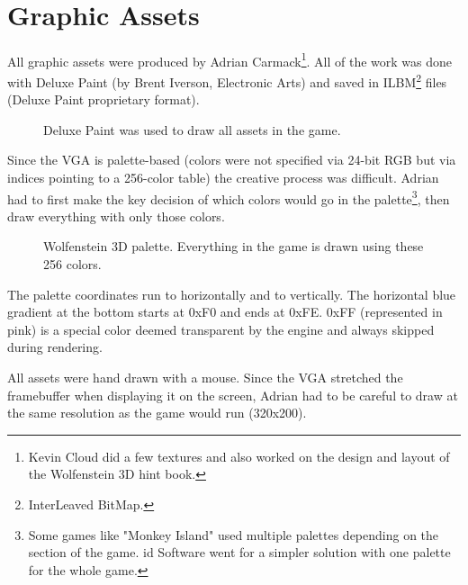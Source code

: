 \documentclass[book.tex]{subfiles}
\begin{document}
  \\
\vspace{-5pt}  
\par
\vspace{5pt}
\section{Graphic Assets}

All graphic assets were produced by Adrian Carmack\footnote{Kevin Cloud did a few textures and also worked on the design and layout of the Wolfenstein 3D hint book.}. All of the work was done with Deluxe Paint (by Brent Iverson, Electronic Arts) and saved in ILBM\footnote{InterLeaved BitMap.} files (Deluxe Paint proprietary format). 

\begin{figure}[H]
  \centering
 \caption{Deluxe Paint was used to draw all assets in the game.}
\end{figure}


\par
Since the VGA is palette-based (colors were not specified via 24-bit RGB but via indices pointing to a 256-color table) the creative process was difficult. Adrian had to first make the key decision of which colors would go in the palette\footnote{Some games like "Monkey Island" used multiple palettes depending on the section of the game. id Software went for a simpler solution with one palette for the whole game.}, then draw everything with only those colors.\\
\begin{figure}[H]
  \centering
{}
 \caption{Wolfenstein 3D palette. Everything in the game is drawn using these 256 colors.}
\end{figure}
The palette coordinates run  to  horizontally and  to  vertically. The horizontal blue gradient at the bottom starts at 0xF0 and ends at 0xFE. 0xFF (represented in pink) is a special color deemed transparent by the engine and always skipped during rendering.\\
\par

All assets were hand drawn with a mouse. Since the VGA stretched the framebuffer when displaying it on the screen, Adrian had to be careful to draw at the same resolution as the game would run (320x200).
\end{document}
